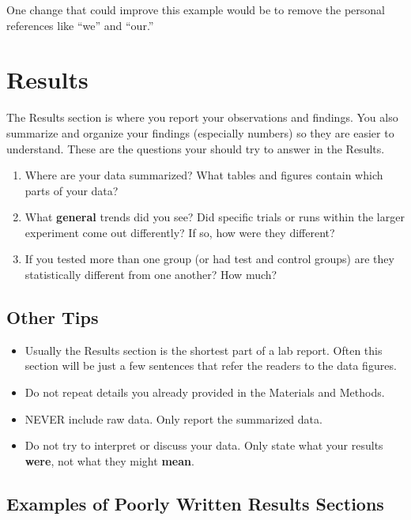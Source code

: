 \documentclass[
]{book}
\providecommand{\tightlist}{%
  \setlength{\itemsep}{0pt}\setlength{\parskip}{0pt}}
\begin{document}
One change that could improve this example would be to remove the personal references like ``we'' and ``our.''

\hypertarget{results360}{%
\chapter{Results}\label{results360}}

The Results section is where you report your observations and findings. You also summarize and organize your findings (especially numbers) so they are easier to understand. These are the questions your should try to answer in the Results.

\begin{enumerate}
\def\labelenumi{\arabic{enumi}.}
\tightlist
\item
  Where are your data summarized? What tables and figures contain which parts of your data?
\item
  What \textbf{general} trends did you see? Did specific trials or runs within the larger experiment come out differently? If so, how were they different?
\item
  If you tested more than one group (or had test and control groups) are they statistically different from one another? How much?
\end{enumerate}

\hypertarget{other-tips-1}{%
\section{Other Tips}\label{other-tips-1}}

\begin{itemize}
\tightlist
\item
  Usually the Results section is the shortest part of a lab report. Often this section will be just a few sentences that refer the readers to the data figures.
\item
  Do not repeat details you already provided in the Materials and Methods.
\item
  NEVER include raw data. Only report the summarized data.
\item
  Do not try to interpret or discuss your data. Only state what your results \textbf{were}, not what they might \textbf{mean}.
\end{itemize}

\hypertarget{examples-of-poorly-written-results-sections}{%
\section{Examples of Poorly Written Results Sections}\label{examples-of-poorly-written-results-sections}}
\end{document}
